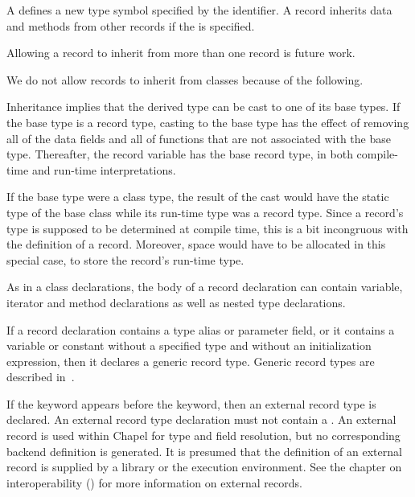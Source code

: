 A  defines a new type symbol specified by the
identifier.  A record inherits data and methods from other records
if the  is specified.

\begin{future}
Allowing a record to inherit from more than one record is future work.
\end{future}

\begin{rationale}
We do not allow records to inherit from classes because of the following.

Inheritance implies that the derived type can be cast to one of its base types.
If the base type is a record type, casting to the base type has the effect of
removing all of the data fields and all of functions that are not associated
with the base type.  Thereafter, the record variable has the base record type,
in both compile-time and run-time interpretations.

If the base type were a class type, the result of the cast would have the static
type of the base class while its run-time type was a record type.  Since a
record's type is supposed to be determined at compile time, this is a bit
incongruous with the definition of a record.  Moreover, space would have to be
allocated in this special case, to store the record's run-time type.
\end{rationale}

As in a class declarations, the body of a record declaration can contain
variable, iterator and method declarations as well as nested type declarations.

If a record declaration contains a type alias or parameter field, or it contains
a variable or constant without a specified type and without an initialization
expression, then it declares a generic record type.  Generic record types are
described in~.

If the  keyword appears before the  keyword, then an
external record type is declared.  An external record type declaration must not
contain a .  An external record is used within Chapel
for type and field resolution, but no corresponding backend definition is
generated.  It is presumed that the definition of an external record is supplied
by a library or the execution environment.  See the chapter on interoperability
() for more information on external records.

